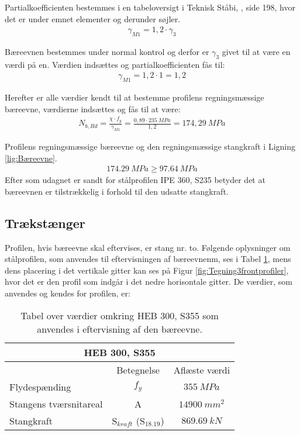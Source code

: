 Partialkoefficienten bestemmes i en tabeloversigt i Teknisk Ståbi, \citep{TekniskStobi}, side 198, hvor det er under emnet elementer og derunder søjler. 
\begin{align*}
\gamma_{M1} = 1,2 \cdot \gamma_3
\end{align*}

Bæreevnen bestemmes under normal kontrol og derfor er $\gamma_3$  givet til at være en værdi på en. Værdien indsættes og partialkoefficienten fås til:
\begin{align*}
\gamma_{M1} = 1,2 \cdot 1 = 1,2
\end{align*}

Herefter er alle værdier kendt til at bestemme profilens regningsmæssige bæreevne, værdierne indsættes og fås til at være:
\begin{align*}
N_{b,Rd}  = \frac{\chi \cdot f_y  }{\gamma_{M1}} = {\frac{0,89 \cdot 235 \SI{}{MPa}}{1,2}} = 174,29 \SI{}{MPa}
\end{align*}

Profilens regningsmæssige bæreevne og den regningsmæssige stangkraft i Ligning \ref{lig:Bæreevne}.
\begin{align*}
 \SI{174,29}{MPa} \geq \SI{97,64}{MPa}
\end{align*}
Efter som udagnet er sandt for stålprofilen IPE 360, S235 betyder det at bæreevnen er tilstrækkelig i forhold til den udsatte stangkraft.  
 

\subsection{Trækstænger}
Profilen, hvis bæreevne skal eftervises, er stang nr. to. Følgende oplysninger om stålprofilen, som anvendes til eftervisningen af bæreevnenm, ses i Tabel \ref{HEBprofil}, mens dens placering i det vertikale gitter kan ses på Figur \ref{fig:Tegning3frontprofiler}, hvor det er den profil som indgår i det nedre horisontale gitter. De værdier, som anvendes og kendes for profilen, er: 

\begin{table}[H]
\centering

\begin{tabular}{|l|c|c|}
\hline
\multicolumn{3}{|c|}{HEB 300, S355}               \\ \hline
 & Betegnelse & Aflæste værdi \\ \hline
Flydespænding           &   $f_y$  &   $\SI{355}{MPa}$                         \\ \hline
 Stangens tværsnitareal  & A  & $\SI{14900}{mm^2}$                 \\ \hline
  Stangkraft     &  S$_{kraft}$ (S$_{18.19}$)  & $\SI{869,69}{kN}$    \\ \hline
\end{tabular}
\caption{Tabel over værdier omkring HEB 300, S355 som anvendes i eftervisning af den bæreevne. \citep{TekniskStobi}}
\label{HEBprofil}
\end{table}

